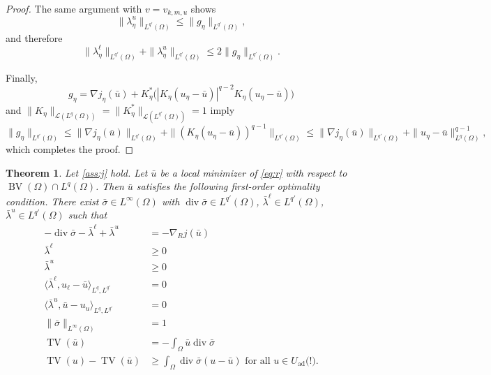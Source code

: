 \documentclass[11pt]{article}
\newcommand{\calL}{\mathcal{L}}
\DeclareMathOperator*{\BV}{BV}
\DeclareMathOperator*{\TV}{TV}
\DeclareMathOperator*{\dvg}{div}
\newcommand{\feas}{U_{\textrm{ad}}}
\newtheorem{theorem}{Theorem}[section]
\theoremstyle{definition}
\theoremstyle{remark}
\begin{document}
\begin{proof}
The same argument with $v=v_{k,m,u}$ shows
\[
\|\lambda^u_\eta\|_{L^{q'}(\Omega)}\le \|g_\eta\|_{L^{q'}(\Omega)},
\]
and therefore
\[
 \|\lambda^\ell_\eta\|_{L^{q'}(\Omega)}
 + \|\lambda^u_\eta\|_{L^{q'}(\Omega)}
 \le 2\|g_\eta\|_{L^{q'}(\Omega)} .
\]

Finally,
\[
  g_\eta
  = \nabla j_\eta(\bar u)
  + K_\eta^*\!\big(|K_\eta(u_\eta-\bar u)|^{q-2}K_\eta(u_\eta-\bar u)\big)
\]
and $\|K_\eta\|_{\calL(L^{q}(\Omega))}=\|K_\eta^*\|_{\calL(L^{q'}(\Omega))}=1$ imply
\[
  \|g_\eta\|_{L^{q'}(\Omega)}
  \le \|\nabla j_\eta(\bar u)\|_{L^{q'}(\Omega)}
  + \|(K_\eta(u_\eta-\bar u))^{q-1}\|_{L^{q'}(\Omega)}
  \le \|\nabla j_\eta(\bar u)\|_{L^{q'}(\Omega)}
  + \|u_\eta-\bar u\|_{L^q(\Omega)}^{q-1},
\]
which completes the proof.
\end{proof}

\begin{theorem}\label{thm:stationarity}
Let \cref{ass:j} hold.	
Let $\bar{u}$ be a local minimizer of \eqref{eq:r} with respect to $\BV(\Omega) \cap L^q(\Omega)$.
Then $\bar{u}$ satisfies the following first-order optimality condition.
There exist $\bar{\sigma} \in L^\infty(\Omega)$ with $\dvg \bar{\sigma} \in L^{q'}(\Omega)$,
$\bar{\lambda}^\ell \in L^{q'}(\Omega)$, $\bar{\lambda}^u \in L^{q'}(\Omega)$ such that
%
\begin{align*}
-\dvg \bar{\sigma} - \bar{\lambda}^\ell + \bar{\lambda}^u &= -\nabla_R j(\bar{u}) \\
\bar{\lambda}^\ell &\ge 0 \\
\bar{\lambda}^u &\ge 0 \\
\langle\bar{\lambda}^\ell, u_\ell - \bar{u}\rangle_{L^q,L^{q'}} &= 0\\
\langle\bar{\lambda}^u, \bar{u} - u_u\rangle_{L^q,L^{q'}} &= 0 \\
\|\bar{\sigma}\|_{L^\infty(\Omega)} &= 1 \\
\TV(\bar{u}) &= -\int_{\Omega} \bar{u} \dvg \bar{\sigma} \\
\TV(u) - \TV(\bar{u}) &\ge \int_{\Omega} \dvg \bar{\sigma}(u - \bar{u}) \text{ for all } u \in \feas \text{(!)}.
\end{align*}
\end{theorem}
\end{document}
